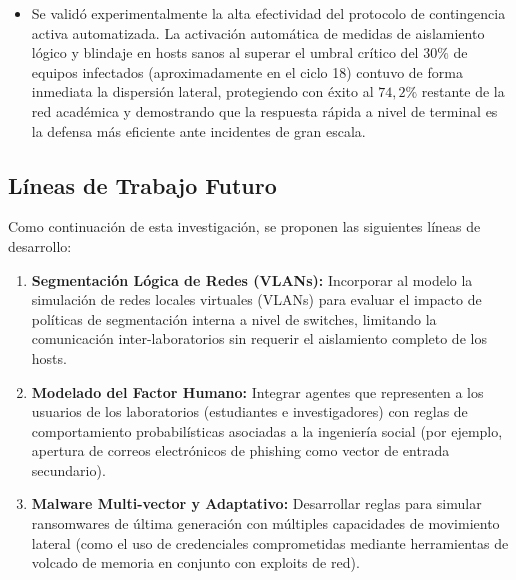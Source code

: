 \begin{itemize}
    \item Se validó experimentalmente la alta efectividad del protocolo de contingencia activa automatizada. La activación automática de medidas de aislamiento lógico y blindaje en hosts sanos al superar el umbral crítico del $30\%$ de equipos infectados (aproximadamente en el ciclo 18) contuvo de forma inmediata la dispersión lateral, protegiendo con éxito al $74,2\%$ restante de la red académica y demostrando que la respuesta rápida a nivel de terminal es la defensa más eficiente ante incidentes de gran escala.
\end{itemize}

\subsection{Líneas de Trabajo Futuro}
Como continuación de esta investigación, se proponen las siguientes líneas de desarrollo:
\begin{enumerate}
    \item \textbf{Segmentación Lógica de Redes (VLANs):} Incorporar al modelo la simulación de redes locales virtuales (VLANs) para evaluar el impacto de políticas de segmentación interna a nivel de switches, limitando la comunicación inter-laboratorios sin requerir el aislamiento completo de los hosts.
    \item \textbf{Modelado del Factor Humano:} Integrar agentes que representen a los usuarios de los laboratorios (estudiantes e investigadores) con reglas de comportamiento probabilísticas asociadas a la ingeniería social (por ejemplo, apertura de correos electrónicos de phishing como vector de entrada secundario).
    \item \textbf{Malware Multi-vector y Adaptativo:} Desarrollar reglas para simular ransomwares de última generación con múltiples capacidades de movimiento lateral (como el uso de credenciales comprometidas mediante herramientas de volcado de memoria en conjunto con exploits de red).
\end{enumerate}
